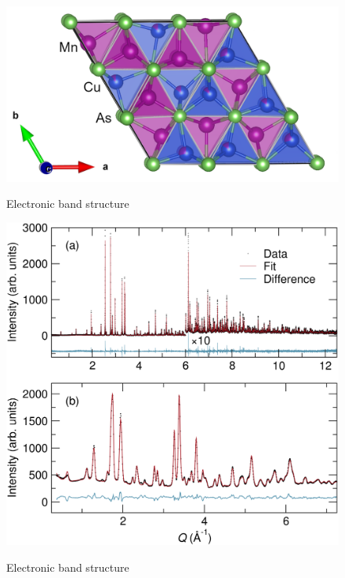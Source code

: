 \documentclass[11pt,edeposit,draftthesis]{uiucthesis2020}
\begin{document}
\begin{mainmatter}
\begin{figure}
\centering\includegraphics[width=\columnwidth]{figures/ch5/CuMnAs_chemical_structure.png} \\
\caption{\label{fig:chemical_structure}
Electronic band structure
}
\end{figure}

\begin{figure}
\centering\includegraphics[width=\columnwidth]{figures/ch5/h-cumnas_11bm_100k_wand_400k_combine.png} \\
\caption{\label{fig:11BM_WAND}
Electronic band structure
}
\end{figure}


\end{mainmatter}
\end{document}
